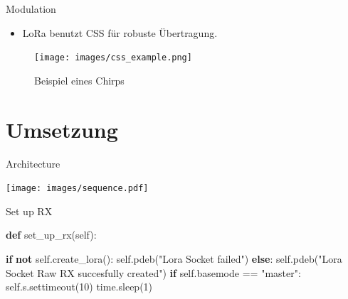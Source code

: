 \documentclass[ignorenonframetext,]{beamer}
\newenvironment{Shaded}{}{}
\newcommand{\ControlFlowTok}[1]{\textcolor[rgb]{0.00,0.44,0.13}{\textbf{#1}}}
\newcommand{\DecValTok}[1]{\textcolor[rgb]{0.25,0.63,0.44}{#1}}
\newcommand{\KeywordTok}[1]{\textcolor[rgb]{0.00,0.44,0.13}{\textbf{#1}}}
\newcommand{\NormalTok}[1]{#1}
\newcommand{\OperatorTok}[1]{\textcolor[rgb]{0.40,0.40,0.40}{#1}}
\newcommand{\StringTok}[1]{\textcolor[rgb]{0.25,0.44,0.63}{#1}}
\newcommand{\VariableTok}[1]{\textcolor[rgb]{0.10,0.09,0.49}{#1}}
\providecommand{\tightlist}{%
  \setlength{\itemsep}{0pt}\setlength{\parskip}{0pt}}
\begin{document}
\begin{frame}{Modulation}
\protect\hypertarget{modulation}{}

\begin{itemize}
\tightlist
\item
  LoRa benutzt CSS für robuste Übertragung.
\end{itemize}

\begin{figure}
\hypertarget{id}{%
\centering
\texttt{[image: images/css\_example.png]}
\caption{Beispiel eines Chirps}\label{id}
}
\end{figure}

\end{frame}

\hypertarget{umsetzung}{%
\section{Umsetzung}\label{umsetzung}}

\begin{frame}{Architecture}
\protect\hypertarget{architecture}{}

\texttt{[image: images/sequence.pdf]}

\end{frame}

\begin{frame}[fragile]{Set up RX}
\protect\hypertarget{set-up-rx}{}

\begin{Shaded}
\begin{Highlighting}[]
    \KeywordTok{def}\NormalTok{ set_up_rx(}\VariableTok{self}\NormalTok{):}

        \ControlFlowTok{if} \KeywordTok{not} \VariableTok{self}\NormalTok{.create_lora():}
            \VariableTok{self}\NormalTok{.pdeb(}\StringTok{"Lora Socket failed"}\NormalTok{)}
        \ControlFlowTok{else}\NormalTok{:}
            \VariableTok{self}\NormalTok{.pdeb(}\StringTok{"Lora Socket Raw RX succesfully created"}\NormalTok{)}
            \ControlFlowTok{if} \VariableTok{self}\NormalTok{.basemode }\OperatorTok{==} \StringTok{"master"}\NormalTok{:}
                \VariableTok{self}\NormalTok{.s.settimeout(}\DecValTok{10}\NormalTok{)}
\NormalTok{        time.sleep(}\DecValTok{1}\NormalTok{)}
\end{Highlighting}
\end{Shaded}

\end{frame}
\end{document}
